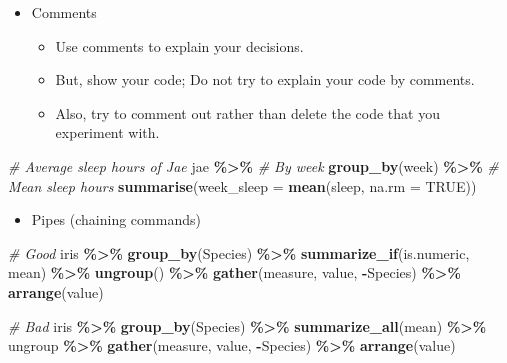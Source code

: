 \documentclass[
]{book}
\newenvironment{Shaded}{\begin{snugshade}}{\end{snugshade}}
\newcommand{\CommentTok}[1]{\textcolor[rgb]{0.56,0.35,0.01}{\textit{#1}}}
\newcommand{\DataTypeTok}[1]{\textcolor[rgb]{0.13,0.29,0.53}{#1}}
\newcommand{\KeywordTok}[1]{\textcolor[rgb]{0.13,0.29,0.53}{\textbf{#1}}}
\newcommand{\NormalTok}[1]{#1}
\newcommand{\OperatorTok}[1]{\textcolor[rgb]{0.81,0.36,0.00}{\textbf{#1}}}
\newcommand{\OtherTok}[1]{\textcolor[rgb]{0.56,0.35,0.01}{#1}}
\newcommand{\StringTok}[1]{\textcolor[rgb]{0.31,0.60,0.02}{#1}}
\providecommand{\tightlist}{%
  \setlength{\itemsep}{0pt}\setlength{\parskip}{0pt}}
\begin{document}
\begin{itemize}
\tightlist
\item
  Comments

  \begin{itemize}
  \tightlist
  \item
    Use comments to explain your decisions.
  \item
    But, show your code; Do not try to explain your code by comments.
  \item
    Also, try to comment out rather than delete the code that you experiment with.
  \end{itemize}
\end{itemize}

\begin{Shaded}
\begin{Highlighting}[]
\CommentTok{\# Average sleep hours of Jae}
\NormalTok{jae }\OperatorTok{\%>\%}
\StringTok{  }\CommentTok{\# By week}
\StringTok{  }\KeywordTok{group\_by}\NormalTok{(week) }\OperatorTok{\%>\%}
\StringTok{  }\CommentTok{\# Mean sleep hours }
\StringTok{  }\KeywordTok{summarise}\NormalTok{(}\DataTypeTok{week\_sleep =} \KeywordTok{mean}\NormalTok{(sleep, }\DataTypeTok{na.rm =} \OtherTok{TRUE}\NormalTok{))}
\end{Highlighting}
\end{Shaded}

\begin{itemize}
\tightlist
\item
  Pipes (chaining commands)
\end{itemize}

\begin{Shaded}
\begin{Highlighting}[]
\CommentTok{\# Good}
\NormalTok{iris }\OperatorTok{\%>\%}
\StringTok{  }\KeywordTok{group\_by}\NormalTok{(Species) }\OperatorTok{\%>\%}
\StringTok{  }\KeywordTok{summarize\_if}\NormalTok{(is.numeric, mean) }\OperatorTok{\%>\%}
\StringTok{  }\KeywordTok{ungroup}\NormalTok{() }\OperatorTok{\%>\%}
\StringTok{  }\KeywordTok{gather}\NormalTok{(measure, value, }\OperatorTok{{-}}\NormalTok{Species) }\OperatorTok{\%>\%}
\StringTok{  }\KeywordTok{arrange}\NormalTok{(value)}

\CommentTok{\# Bad}
\NormalTok{iris }\OperatorTok{\%>\%}\StringTok{ }\KeywordTok{group\_by}\NormalTok{(Species) }\OperatorTok{\%>\%}\StringTok{ }\KeywordTok{summarize\_all}\NormalTok{(mean) }\OperatorTok{\%>\%}
\NormalTok{ungroup }\OperatorTok{\%>\%}\StringTok{ }\KeywordTok{gather}\NormalTok{(measure, value, }\OperatorTok{{-}}\NormalTok{Species) }\OperatorTok{\%>\%}
\KeywordTok{arrange}\NormalTok{(value)}
\end{Highlighting}
\end{Shaded}
\end{document}
